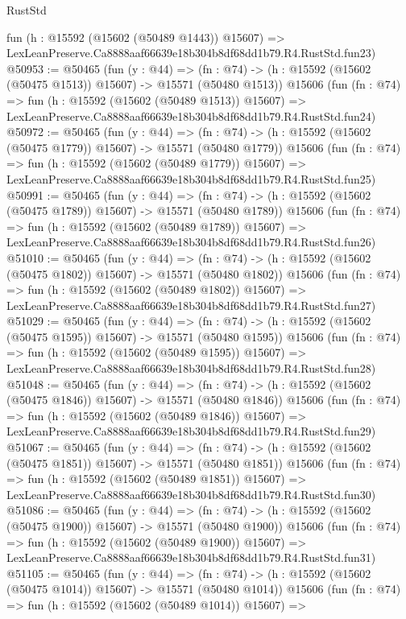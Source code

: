 \begin{lexlean}{RustStd}
\begin{coremodule}
    fun (h : @15592 (@15602 (@50489 @1443)) @15607) =>
    LexLeanPreserve.Ca8888aaf66639e18b304b8df68dd1b79.R4.RustStd.fun23)
@50953 := @50465
    (fun (y : @44) =>
    (fn : @74) -> (h : @15592 (@15602 (@50475 @1513)) @15607) -> @15571 (@50480 @1513))
    @15606
    (fun (fn : @74) =>
    fun (h : @15592 (@15602 (@50489 @1513)) @15607) =>
    LexLeanPreserve.Ca8888aaf66639e18b304b8df68dd1b79.R4.RustStd.fun24)
@50972 := @50465
    (fun (y : @44) =>
    (fn : @74) -> (h : @15592 (@15602 (@50475 @1779)) @15607) -> @15571 (@50480 @1779))
    @15606
    (fun (fn : @74) =>
    fun (h : @15592 (@15602 (@50489 @1779)) @15607) =>
    LexLeanPreserve.Ca8888aaf66639e18b304b8df68dd1b79.R4.RustStd.fun25)
@50991 := @50465
    (fun (y : @44) =>
    (fn : @74) -> (h : @15592 (@15602 (@50475 @1789)) @15607) -> @15571 (@50480 @1789))
    @15606
    (fun (fn : @74) =>
    fun (h : @15592 (@15602 (@50489 @1789)) @15607) =>
    LexLeanPreserve.Ca8888aaf66639e18b304b8df68dd1b79.R4.RustStd.fun26)
@51010 := @50465
    (fun (y : @44) =>
    (fn : @74) -> (h : @15592 (@15602 (@50475 @1802)) @15607) -> @15571 (@50480 @1802))
    @15606
    (fun (fn : @74) =>
    fun (h : @15592 (@15602 (@50489 @1802)) @15607) =>
    LexLeanPreserve.Ca8888aaf66639e18b304b8df68dd1b79.R4.RustStd.fun27)
@51029 := @50465
    (fun (y : @44) =>
    (fn : @74) -> (h : @15592 (@15602 (@50475 @1595)) @15607) -> @15571 (@50480 @1595))
    @15606
    (fun (fn : @74) =>
    fun (h : @15592 (@15602 (@50489 @1595)) @15607) =>
    LexLeanPreserve.Ca8888aaf66639e18b304b8df68dd1b79.R4.RustStd.fun28)
@51048 := @50465
    (fun (y : @44) =>
    (fn : @74) -> (h : @15592 (@15602 (@50475 @1846)) @15607) -> @15571 (@50480 @1846))
    @15606
    (fun (fn : @74) =>
    fun (h : @15592 (@15602 (@50489 @1846)) @15607) =>
    LexLeanPreserve.Ca8888aaf66639e18b304b8df68dd1b79.R4.RustStd.fun29)
@51067 := @50465
    (fun (y : @44) =>
    (fn : @74) -> (h : @15592 (@15602 (@50475 @1851)) @15607) -> @15571 (@50480 @1851))
    @15606
    (fun (fn : @74) =>
    fun (h : @15592 (@15602 (@50489 @1851)) @15607) =>
    LexLeanPreserve.Ca8888aaf66639e18b304b8df68dd1b79.R4.RustStd.fun30)
@51086 := @50465
    (fun (y : @44) =>
    (fn : @74) -> (h : @15592 (@15602 (@50475 @1900)) @15607) -> @15571 (@50480 @1900))
    @15606
    (fun (fn : @74) =>
    fun (h : @15592 (@15602 (@50489 @1900)) @15607) =>
    LexLeanPreserve.Ca8888aaf66639e18b304b8df68dd1b79.R4.RustStd.fun31)
@51105 := @50465
    (fun (y : @44) =>
    (fn : @74) -> (h : @15592 (@15602 (@50475 @1014)) @15607) -> @15571 (@50480 @1014))
    @15606
    (fun (fn : @74) =>
    fun (h : @15592 (@15602 (@50489 @1014)) @15607) =>

\end{coremodule}
\end{lexlean}
